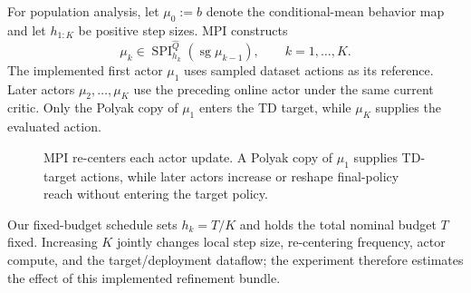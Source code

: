 For population analysis, let $\mu_0:=b$ denote the conditional-mean behavior
map and let $h_{1:K}$ be positive step sizes. MPI constructs
\begin{equation}
 \mu_k\in\operatorname{SPI}_{h_k}^{\widehat Q}
 (\operatorname{sg}\mu_{k-1}),
 \qquad k=1,\ldots,K.
 \label{eq:mpi}
\end{equation}
The implemented first actor $\mu_1$ uses sampled dataset actions as its
reference. Later actors $\mu_2,\ldots,\mu_K$ use the preceding online actor
under the same current critic. Only the Polyak copy of $\mu_1$ enters the TD
target, while $\mu_K$ supplies the evaluated action.

\begin{figure}[t]
\centering
{}
\caption{MPI re-centers each actor update. A Polyak copy of $\mu_1$ supplies
TD-target actions, while later actors increase or reshape final-policy reach
without entering the target policy.}
\label{fig:architecture}
\end{figure}

Our fixed-budget schedule sets $h_k=T/K$ and holds the total nominal budget
$T$ fixed. Increasing $K$ jointly changes local step size, re-centering
frequency, actor compute, and the target/deployment dataflow; the experiment
therefore estimates the effect of this implemented refinement bundle.


